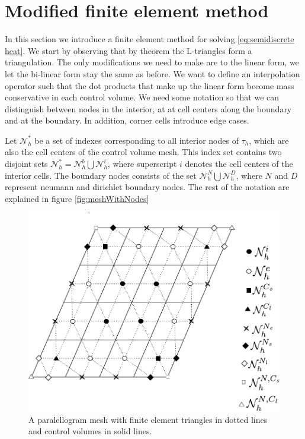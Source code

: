 \documentclass[../Main/main.tex]{subfiles}
\begin{document}
	\section*{Modified finite element method}
	In this section we introduce a finite element method for solving \eqref{eq:semidiscrete heat}. We start by observing that by theorem  the L-triangles form a triangulation. The only modifications we need to make are to the linear form, we let the bi-linear form stay the same as before. We want to define an interpolation operator such that the dot products that make up the linear form become mass conservative in each control volume. We need some notation so that we can distinguish between nodes in the interior, at at cell centers along the boundary and at the boundary. In addition, corner cells introduce edge cases. 
	\par 
	Let $\mathcal{N}_h^*$ be a set of indexes corresponding to all interior nodes of $\tau_h$, which are also the cell centers of the control volume mesh. This index set contains two disjoint sets $\mathcal{N}_h^* = \mathcal{N}_h^b \bigcup \mathcal{N}_h^i$, where superscript $i$ denotes the cell centers of the interior cells. The boundary nodes consists of the set $\mathcal{N}_h^N \bigcup \mathcal{N}_h^D$, where $N$ and $D$ represent neumann and dirichlet boundary nodes. The rest of the notation are explained in figure \ref{fig:meshWithNodes}
	\begin{figure}[H]\label{fig:mesWithNodes}
		\centering
		\includegraphics{meshWithNodes.pdf}
		\caption{A paralellogram mesh with finite element triangles in dotted lines and control volumes in solid lines.}
	\end{figure}
\end{document}
